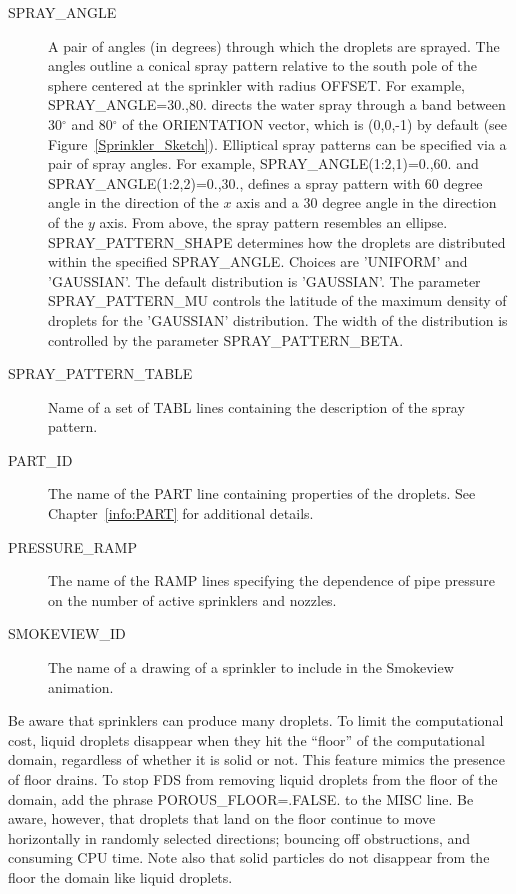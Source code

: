 \documentclass[11pt]{book}
\begin{document}
\begin{description}
\item[{\ct SPRAY\_ANGLE}] A pair of angles (in degrees) through which the droplets are sprayed. The angles outline a conical spray pattern relative to the south pole of the sphere centered at the sprinkler with radius {\ct OFFSET}. For example, {\ct SPRAY\_ANGLE=30.,80.} directs the water spray through a band between 30$^\circ$ and 80$^\circ$ of the {\ct ORIENTATION} vector, which is (0,0,-1) by default (see Figure~\ref{Sprinkler_Sketch}). Elliptical spray patterns can be specified via a pair of spray angles. For example, {\ct SPRAY\_ANGLE(1:2,1)=0.,60.}  and {\ct SPRAY\_ANGLE(1:2,2)=0.,30.}, defines a spray pattern with 60 degree angle in the direction of the $x$ axis and a 30 degree angle in the direction of the $y$ axis. From above, the spray pattern resembles an ellipse. {\ct SPRAY\_PATTERN\_SHAPE} determines how the droplets are distributed within the specified {\ct SPRAY\_ANGLE}. Choices are {\ct 'UNIFORM'} and {\ct 'GAUSSIAN'}. The default distribution is {\ct 'GAUSSIAN'}. The parameter {\ct SPRAY\_PATTERN\_MU} controls the latitude of the maximum density of droplets for the {\ct 'GAUSSIAN'} distribution. The width of the distribution is controlled by the parameter {\ct SPRAY\_PATTERN\_BETA}.
\item[{\ct SPRAY\_PATTERN\_TABLE}] Name of a set of {\ct TABL} lines containing the description of the spray pattern.
\item[{\ct PART\_ID}] The name of the {\ct PART} line containing properties of the droplets. See Chapter~\ref{info:PART} for additional details.
\item[{\ct PRESSURE\_RAMP}] The name of the {\ct RAMP} lines specifying the dependence of pipe pressure on the number of active sprinklers and nozzles.
\item[{\ct SMOKEVIEW\_ID}] The name of a drawing of a sprinkler to include in the Smokeview animation.
\end{description}
Be aware that sprinklers can produce many droplets. To limit the computational cost, liquid droplets disappear when they hit the ``floor'' of the computational domain, regardless of whether it is solid or not. This feature mimics the presence of floor drains. To stop FDS from removing liquid droplets from the floor of the domain, add the phrase {\ct POROUS\_FLOOR=.FALSE.} to the {\ct MISC} line. Be aware, however, that droplets that land on the floor continue to move horizontally in randomly selected directions; bouncing off obstructions, and consuming CPU time. Note also that solid particles do not disappear from the floor the domain like liquid droplets.
\end{document}
